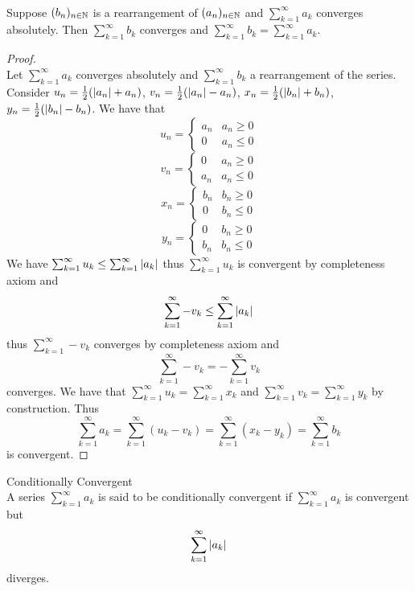 \documentclass[a4paper]{article}
\begin{document}
\begin{thm}{}{}\\ Suppose $(b_n)_{n\in\mathbb{N}}$ is a rearrangement of $(a_n)_{n\in\mathbb{N}}$ and $\sum_{k=1}^{\infty}a_k$ converges absolutely. Then $\sum_{k=1}^{\infty}b_k$ converges and $\sum_{k=1}^{\infty}b_k=\sum_{k=1}^{\infty}a_k$. 
\begin{proof}\\
Let $\sum_{k=1}^{\infty}a_k$ converges absolutely and $\sum_{k=1}^{\infty}b_k$ a rearrangement of the series. Consider $u_n=\frac{1}{2}(\abs{a_n}+a_n)$, $v_n=\frac{1}{2}(\abs{a_n}-a_n)$, $x_n=\frac{1}{2}(\abs{b_n}+b_n)$, $y_n=\frac{1}{2}(\abs{b_n}-b_n)$. We have that $$u_n=\begin{cases}
a_n & a_n\geq0\\
0 & a_n\leq 0
\end{cases}$$ $$v_n=\begin{cases}
0 & a_n\geq0\\
a_n & a_n\leq 0
\end{cases}$$ $$x_n=\begin{cases}
b_n & b_n\geq0\\
0 & b_n\leq 0
\end{cases}$$ $$y_n=\begin{cases}
0 & b_n\geq0\\
b_n & b_n\leq 0
\end{cases}$$
We have $\sum_{k=1}^{\infty}u_k\leq\sum_{k=1}^{\infty}\abs{a_k}$ thus $\sum_{k=1}^{\infty}u_k$ is convergent by completeness axiom and $$\sum_{k=1}^{\infty}-v_k\leq\sum_{k=1}^{\infty}\abs{a_k}$$ thus $\sum_{k=1}^{\infty}-v_k$ converges by completeness axiom and $$\sum_{k=1}^{\infty}-v_k=-\sum_{k=1}^{\infty}v_k$$ converges. We have that $\sum_{k=1}^{\infty} u_k=\sum_{k=1}^{\infty} x_k$ and $\sum_{k=1}^{\infty} v_k=\sum_{k=1}^{\infty} y_k$ by construction. Thus $$\sum_{k=1}^{\infty} a_k=\sum_{k=1}^{\infty}(u_k-v_k)=\sum_{k=1}^{\infty}(x_k-y_k)=\sum_{k=1}^{\infty} b_k$$ is convergent. 
\end{proof}
\end{thm}

\begin{defn}{Conditionally Convergent}{}\\ A series $\sum_{k=1}^{\infty}a_k$ is said to be conditionally convergent if $\sum_{k=1}^{\infty}a_k$ is convergent but $$\sum_{k=1}^{\infty}\abs{a_k}$$ diverges. 
\end{defn}
\end{document}
